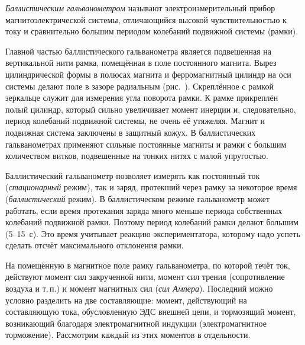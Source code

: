 \label{lab:galvanometr}



\emph{Баллистическим гальванометром} называют электроизмерительный прибор
магнитоэлектрической системы, отличающийся высокой чувствительностью к
току и сравнительно большим периодом колебаний подвижной системы
(рамки).

Главной частью баллистического гальванометра является подвешенная на
вертикальной нити рамка, помещённая в поле постоянного магнита. Вырез
цилиндрической формы в полюсах магнита и ферромагнитный цилиндр на оси
системы делают поле в зазоре радиальным (рис.~). 
Скреплённое с рамкой
зеркальце служит для измерения угла поворота рамки. К рамке прикреплён
полый цилиндр, который сильно увеличивает момент инерции и,
следовательно, период колебаний подвижной системы, не очень её утяжеляя.
Магнит и подвижная система заключены в защитный кожух. В баллистических
гальванометрах применяют сильные постоянные магниты и рамки с большим
количеством витков, подвешенные на тонких нитях с малой упругостью.

Баллистический гальванометр позволяет измерять как постоянный ток
(\emph{стационарный} режим), так и заряд, протекший через рамку за некоторое
время (\emph{баллистический} режим). В баллистическом режиме гальванометр может
работать, если время протекания заряда много меньше периода собственных
колебаний подвижной рамки. Поэтому период колебаний рамки делают большим
(5--15~с). Это время учитывает реакцию экспериментатора, которому надо
успеть сделать отсчёт максимального отклонения рамки.

На помещённую в магнитное поле рамку гальванометра, по которой течёт ток, 
действуют момент сил закрученной нити, момент сил трения (сопротивление
воздуха и т.\,п.) и момент магнитных сил (\emph{сил Ампера}).
Последний можно условно разделить на две составляющие: момент, действующий
на составляющую тока, обусловленную ЭДС внешней цепи, и тормозящий момент,
возникающий благодаря электромагнитной индукции (электромагнитное торможение). 
Рассмотрим каждый из этих моментов в отдельности.

